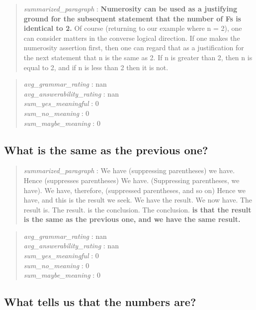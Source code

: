 \begin{quote}
\emph{summarized\_paragraph} : \textbf{Numerosity can be used as a
justifying ground for the subsequent statement that the number of Fs is
identical to 2.} Of course (returning to our example where n = 2), one
can consider matters in the converse logical direction. If one makes the
numerosity assertion first, then one can regard that as a justification
for the next statement that n is the same as 2. If n is greater than 2,
then n is equal to 2, and if n is less than 2 then it is not.
\end{quote}

\begin{quote}
\emph{avg\_grammar\_rating} : nan\\
\emph{avg\_answerability\_rating} : nan\\
\emph{sum\_yes\_meaningful} : 0\\
\emph{sum\_no\_meaning} : 0\\
\emph{sum\_maybe\_meaning} : 0
\end{quote}

\hypertarget{what-is-the-same-as-the-previous-one}{%
\subsection{What is the same as the previous
one?}\label{what-is-the-same-as-the-previous-one}}

\begin{quote}
\emph{summarized\_paragraph} : We have (suppressing parentheses) we
have. Hence (suppresses parentheses) We have. (Suppressing parentheses,
we have). We have, therefore, (suppressed parentheses, and so on) Hence
we have, and this is the result we seek. We have the result. We now
have. The result is. The result. is the conclusion. The conclusion.
\textbf{is that the result is the same as the previous one, and we have
the same result.}
\end{quote}

\begin{quote}
\emph{avg\_grammar\_rating} : nan\\
\emph{avg\_answerability\_rating} : nan\\
\emph{sum\_yes\_meaningful} : 0\\
\emph{sum\_no\_meaning} : 0\\
\emph{sum\_maybe\_meaning} : 0
\end{quote}

\hypertarget{what-tells-us-that-the-numbers-are}{%
\subsection{What tells us that the numbers
are?}\label{what-tells-us-that-the-numbers-are}}

